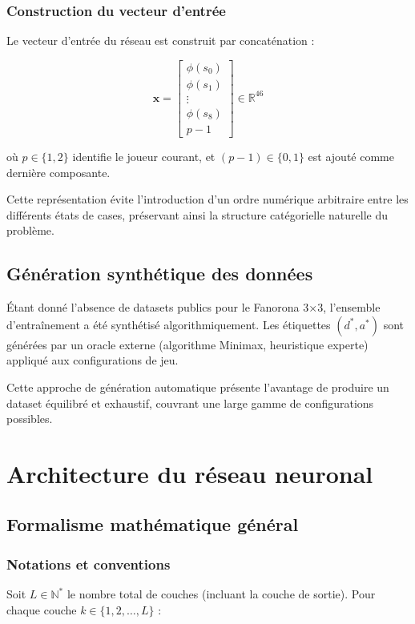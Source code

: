 \documentclass[12pt,a4paper]{report}
\numberwithin{equation}{section}
\begin{document}
\subsection{Construction du vecteur d'entrée}
Le vecteur d'entrée du réseau est construit par concaténation :

$$\mathbf{x} = \begin{bmatrix}
\phi(s_0)\\
\phi(s_1)\\
\vdots\\
\phi(s_8)\\
p - 1
\end{bmatrix} \in \mathbb{R}^{46}$$

où $p \in \{1, 2\}$ identifie le joueur courant, et $(p-1) \in \{0, 1\}$ est ajouté comme dernière composante.

\begin{remark}
Cette représentation évite l'introduction d'un ordre numérique arbitraire entre les différents états de cases, préservant ainsi la structure catégorielle naturelle du problème.
\end{remark}

\section{Génération synthétique des données}

\begin{important}
Étant donné l'absence de datasets publics pour le Fanorona 3×3, l'ensemble d'entraînement a été synthétisé algorithmiquement. Les étiquettes $(d^*, a^*)$ sont générées par un oracle externe (algorithme Minimax, heuristique experte) appliqué aux configurations de jeu.
\end{important}

Cette approche de génération automatique présente l'avantage de produire un dataset équilibré et exhaustif, couvrant une large gamme de configurations possibles.

\chapter{Architecture du réseau neuronal}

\section{Formalisme mathématique général}

\subsection{Notations et conventions}
Soit $L \in \mathbb{N}^*$ le nombre total de couches (incluant la couche de sortie). Pour chaque couche $k \in \{1, 2, \ldots, L\}$ :
\end{document}
